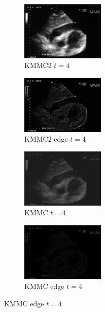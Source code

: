 \documentclass[a4paper,10pt,twocolumn]{article}
\begin{document}
\begin{center}
\begin{figure}[!htb]
		\begin{subfigure}[d!]{4cm}
			\includegraphics[width=4cm]{image/im1/im_1_4}
			\caption{KMMC2 $t = 4$}
		\end{subfigure}
		\begin{subfigure}[e!]{4cm}
			\includegraphics[width=4cm]{image/im1/im_1_4_edge}
			\caption{KMMC2 edge $t = 4$}
		\end{subfigure}
		\begin{subfigure}[f!]{4cm}
			\includegraphics[width=4cm]{image/im1/im_1_4_norm}
			\caption{KMMC $t = 4$}
		\end{subfigure}
		\begin{subfigure}[g!]{4cm}
			\includegraphics[width=4cm]{image/im1/im_1_4_norm_edge}
			\caption{KMMC edge $t = 4$}
		\end{subfigure}
		

\end{figure}
\end{center}
\end{document}
